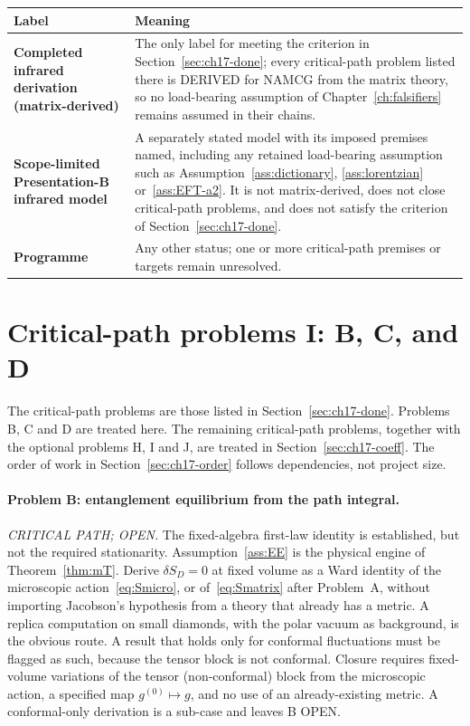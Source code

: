 \begin{center}
\begin{tabular}{@{}>{\raggedright\arraybackslash}p{}>{\raggedright\arraybackslash}p{}@{}}
\toprule
Label & Meaning \\
\midrule
\textbf{Completed infrared derivation (matrix-derived)} &
The only label for meeting the criterion in
Section~\ref{sec:ch17-done}; every critical-path problem listed
there is DERIVED for NAMCG from the matrix theory, so no
load-bearing assumption of Chapter~\ref{ch:falsifiers} remains
assumed in their chains. \\
\textbf{Scope-limited Presentation-B infrared model} &
A separately stated model with its imposed premises named,
including any retained load-bearing assumption such as
Assumption~\ref{ass:dictionary}, \ref{ass:lorentzian}
or~\ref{ass:EFT-a2}. It is not matrix-derived, does not close
critical-path problems, and does not satisfy the criterion of
Section~\ref{sec:ch17-done}. \\
\textbf{Programme} &
Any other status; one or more critical-path premises or targets
remain unresolved. \\
\bottomrule
\end{tabular}
\end{center}

\section{Critical-path problems I: B, C, and D}
\label{sec:ch17-bearing}

The critical-path problems are those listed in
Section~\ref{sec:ch17-done}. Problems B, C and D are treated here.
The remaining critical-path problems, together with the optional
problems H, I and J, are treated in Section~\ref{sec:ch17-coeff}.
The order of work in Section~\ref{sec:ch17-order} follows
dependencies, not project size.

\paragraph{Problem B: entanglement equilibrium from the path
integral.}
\emph{CRITICAL PATH; OPEN.} The fixed-algebra first-law identity
is established, but not the required stationarity.
Assumption~\ref{ass:EE} is the physical engine of
Theorem~\ref{thm:mT}. Derive \(\delta S_D=0\) at fixed volume as
a Ward identity of the microscopic action~\eqref{eq:Smicro}, or
of~\eqref{eq:Smatrix} after Problem~A, without importing Jacobson's
hypothesis from a theory that already has a metric. A replica
computation on small diamonds, with the polar vacuum as background,
is the obvious route. A result that holds only for conformal
fluctuations must be flagged as such, because the tensor block is
not conformal.
Closure requires fixed-volume variations of the tensor (non-conformal)
block from the microscopic action, a specified map
\(g^{(0)}\mapsto g\), and no use of an already-existing metric. A
conformal-only derivation is a sub-case and leaves B OPEN.

